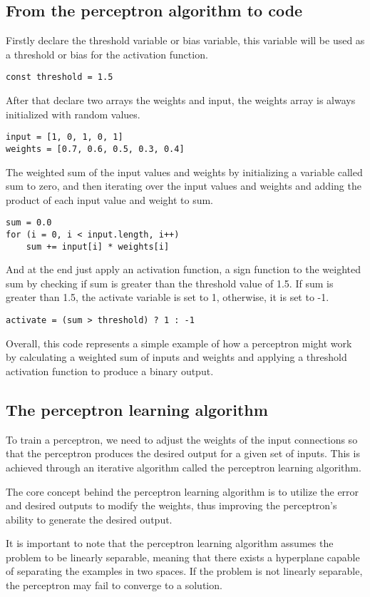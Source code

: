 \subsection{From the perceptron algorithm to code}
Firstly declare the threshold variable or bias variable,
this variable will be used as a threshold or bias for the activation function.
\begin{verbatim}
const threshold = 1.5
\end{verbatim}
After that declare two arrays the weights and input, the weights array is always initialized with random
values.
\begin{verbatim}
input = [1, 0, 1, 0, 1]
weights = [0.7, 0.6, 0.5, 0.3, 0.4]
\end{verbatim}
The weighted sum of the input values and weights by initializing a variable called sum to zero,
and then iterating over the input values and weights and adding the product of each input value
and weight to sum.
\begin{verbatim}
sum = 0.0
for (i = 0, i < input.length, i++)
    sum += input[i] * weights[i]
\end{verbatim}
And at the end just apply an activation function, a sign function to the weighted sum by checking
if sum is greater
than the threshold value of 1.5. If sum is greater than 1.5,
the activate variable is set to 1, otherwise, it is set to -1.
\begin{verbatim}
activate = (sum > threshold) ? 1 : -1
\end{verbatim}
Overall, this code represents a simple example of how a perceptron might work by calculating a
weighted sum of inputs and weights and applying a threshold activation function to produce a
binary output.
\subsection{The perceptron learning algorithm}
To train a perceptron, we need to adjust the weights of the input connections so that the perceptron produces
the desired output for a given set of inputs. This is achieved through an iterative algorithm called the
perceptron learning algorithm.

The core concept behind the perceptron learning algorithm is to utilize the error and
desired outputs to modify the weights, thus improving the perceptron's ability to generate the desired output.

It is important to note that the perceptron learning algorithm assumes the problem to be linearly separable,
meaning that there exists a hyperplane capable of separating the examples in two spaces.
If the problem is not linearly separable, the perceptron may fail to converge to a solution.

